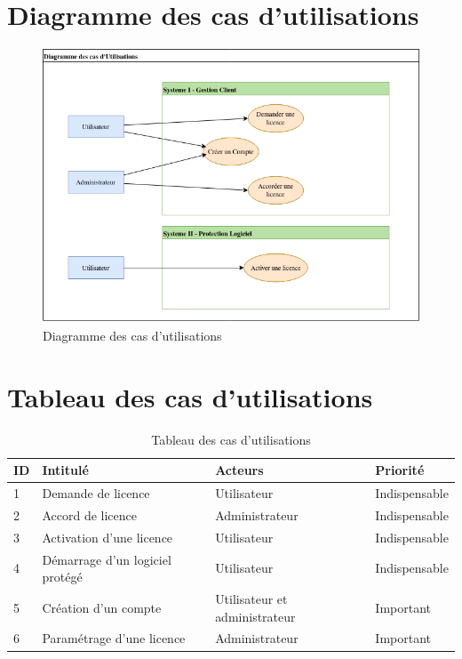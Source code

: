 \newpage

\section{Diagramme des cas d'utilisations}

\begin{figure}[h]
	\centering
	\includegraphics[width=16cm]{main/png/Util.png}
	\caption{Diagramme des cas d'utilisations}
	\label{fig:fig2}
\end{figure}

\section{Tableau des cas d'utilisations}

\begin{table}[h]
	\centering
	\begin{tabular}{ | m{0.6cm} | m{6cm} | m{6cm}| m{3cm} | } 
                \hline
		\textbf{ID} & \textbf{Intitulé} & \textbf{Acteurs} & \textbf{Priorité} \\
        \hline
			1 & Demande de licence & Utilisateur & Indispensable \\
        \hline
			2 & Accord de licence & Administrateur & Indispensable \\
        \hline
			3 & Activation d'une licence & Utilisateur & Indispensable \\
        \hline
			4 & Démarrage d'un logiciel protégé & Utilisateur & Indispensable \\
		\hline
			5 & Création d'un compte & Utilisateur et administrateur & Important \\
		\hline
			6 & Paramétrage d'une licence & Administrateur & Important \\
		\hline
        \end{tabular}
	\caption{Tableau des cas d'utilisations}
	\label{tab:tab1}
\end{table}
\newpage

